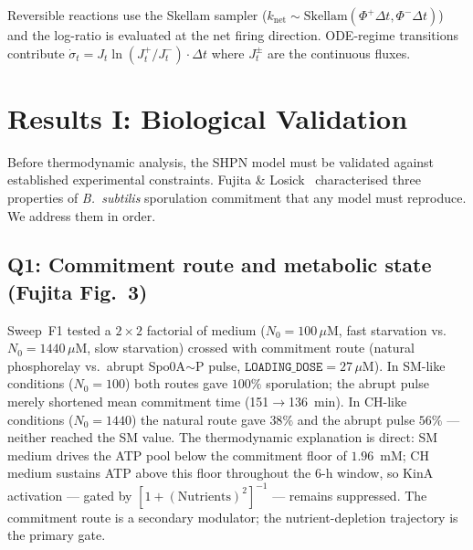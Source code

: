 \documentclass[11pt,a4paper]{article}
\newcommand{\EPR}{\dot{\sigma}}
\begin{document}
Reversible reactions use the Skellam sampler
($k_{\mathrm{net}} \sim \mathrm{Skellam}(\Phi^+\Delta t, \Phi^-\Delta t)$)
and the log-ratio is evaluated at the net firing direction.
ODE-regime transitions contribute $\EPR_t = J_t \ln(J_t^+/J_t^-)
\cdot \Delta t$ where $J_t^\pm$ are the continuous fluxes.

\section{Results I: Biological Validation}
\label{sec:results_bio}


Before thermodynamic analysis, the SHPN model must be validated against
established experimental constraints.
Fujita \& Losick~\cite{Fujita2005} characterised three properties of
\textit{B.~subtilis} sporulation commitment that any model must
reproduce.
We address them in order.

\subsection{Q1: Commitment route and metabolic state (Fujita Fig.\ 3)}

Sweep~F1 tested a $2\times2$ factorial of medium ($N_0 = 100\,\mu$M, fast
starvation vs.~$N_0 = 1440\,\mu$M, slow starvation) crossed with
commitment route (natural phosphorelay vs.~abrupt Spo0A$\sim$P pulse,
$\texttt{LOADING\_DOSE} = 27\,\mu$M).
In SM-like conditions ($N_0 = 100$) both routes gave $100\%$ sporulation;
the abrupt pulse merely shortened mean commitment time (151$\to$136~min).
In CH-like conditions ($N_0 = 1440$) the natural route gave $38\%$ and the
abrupt pulse $56\%$ --- neither reached the SM value.
The thermodynamic explanation is direct: SM medium drives the ATP pool below
the commitment floor of $1.96$~mM; CH medium sustains ATP above this
floor throughout the 6-h window, so KinA activation --- gated by
$[1 + (\text{Nutrients})^2]^{-1}$ --- remains suppressed.
The commitment route is a secondary modulator; the nutrient-depletion
trajectory is the primary gate.
\end{document}

